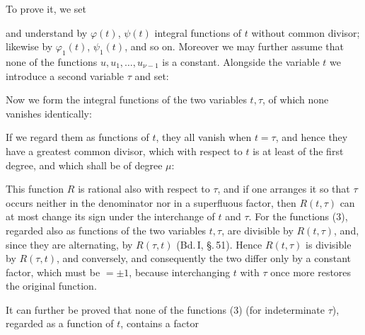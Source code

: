 
To prove it, we set


and understand by $\varphi(t)$, $\psi(t)$ integral functions of $t$
without common divisor; likewise by $\varphi_1(t)$,
$\psi_1(t)$, and so on. Moreover we may further assume that
none of the functions $u, u_1, \ldots, u_{\nu-1}$ is a constant.
Alongside the variable $t$ we introduce a second variable $\tau$ and
set:


Now we form the integral functions of the two variables $t, \tau$,
of which none vanishes identically:


If we regard them as functions of $t$, they all vanish
when $t = \tau$, and hence they have a greatest
common divisor, which with respect to $t$ is at least of the
first degree, and which shall be of degree $\mu$:


This function $R$ is rational also with respect to $\tau$, and if
one arranges it so that $\tau$ occurs neither in the denominator nor in a
superfluous factor, then $R(t, \tau)$ can at most change its sign
under the interchange of $t$ and $\tau$.
For the functions (3), regarded also as functions of the two
variables $t, \tau$, are divisible by $R(t, \tau)$, and, since they
are alternating, by $R(\tau, t)$ (Bd.\,I, \S.\,51). Hence
$R(t, \tau)$ is divisible by $R(\tau, t)$, and conversely, and
consequently the two differ only by a constant factor,
which must be $= \pm 1$, because interchanging $t$ with
$\tau$ once more restores the original function.

It can further be proved that none of the functions (3) (for
indeterminate $\tau$), regarded as a function of $t$, contains a factor
